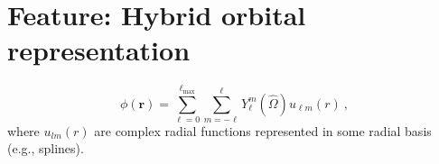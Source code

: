 \section{Feature: Hybrid orbital representation}


\renewcommand{\vr}{\mathbf{r}}

\begin{equation}
\phi(\vr) = \sum_{\ell=0}^{\ell_\text{max}} \sum_{m=-\ell}^\ell Y_\ell^m (\hat{\Omega})
u_{\ell m}(r)\:,
\end{equation}
where $u_{lm}(r)$ are complex radial functions represented in some
radial basis (e.g., splines).

